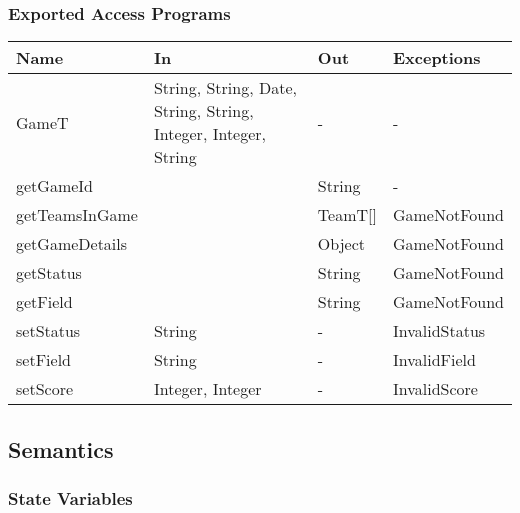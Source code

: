 \documentclass[12pt, titlepage]{article}
\begin{document}
\subsubsection{Exported Access Programs}
\begin{center}
  \begin{tabular}{|p{4cm}| p{4cm}| p{4cm} | p{3cm}|}
    \hline
    \textbf{Name}  & \textbf{In}                                                    & \textbf{Out} & \textbf{Exceptions} \\
    \hline
    GameT          & String, String, Date, String, String, Integer, Integer, String & -            & -                   \\
    getGameId      &                                                                & String       & -                   \\
    getTeamsInGame &                                                                & TeamT[]      & GameNotFound        \\
    getGameDetails &                                                                & Object       & GameNotFound        \\
    getStatus      &                                                                & String       & GameNotFound        \\
    getField       &                                                                & String       & GameNotFound        \\
    setStatus      & String                                                         & -            & InvalidStatus       \\
    setField       & String                                                         & -            & InvalidField        \\
    setScore       & Integer, Integer                                               & -            & InvalidScore        \\
    \hline
  \end{tabular}
\end{center}

\subsection{Semantics}

\subsubsection{State Variables}
\end{document}
